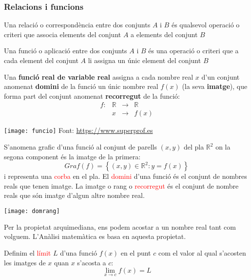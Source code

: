 \documentclass{beamer}
\begin{document}
\begin{frame}[allowframebreaks]
  \frametitle{Relacions i funcions}
  \begin{definicio}
    Una relació o correspondència entre dos conjunts $A$ i $B$ és qualsevol operació o criteri que associa elements del conjunt $A$ a elements del conjunt $B$
  \end{definicio}
  \begin{definicio}
    Una funció o aplicació entre dos conjunts $A$ i $B$ és una operació o criteri que a cada element del conjunt $A$ li assigna un únic element del conjunt $B$
  \end{definicio}
  Una {\bf funció real de variable real} assigna a cada nombre real $x$ d'un conjunt anomenat {\bf domini} de la funció un únic nombre real $f(x)$ (la seva {\bf imatge}), que forma part del conjunt anomenat {\bf recorregut} de la funció:
  \[
    \begin{array}{cccc}
      f:&\mathbb{R}&\rightarrow&\mathbb{R}\\
      &x&\rightarrow&f(x)
    \end{array}
  \]
  \begin{center}
    \texttt{[image: funcio]}
    \newline Font: \url{https://www.superprof.es}
  \end{center}
  S'anomena grafic d'una funció al conjunt de parells $(x,y)$ del pla $\mathbb{R}^2$ on la segona component és la imatge de la primera:
  \[
    Graf(f)=\left\{(x,y)\in \mathbb{R}^2: y= f(x)\right\}
  \]
  i representa una \textcolor{red}{corba} en el pla. El \textcolor{red}{domini} d'una funció és el conjunt de nombres reals que tenen imatge. La imatge o rang o \textcolor{red}{recorregut} és el conjunt de nombre reals que són imatge d'algun altre nombre real.
  \begin{center}
     \texttt{[image: domrang]}
  \end{center}

  Per la propietat arquimediana, ens podem acostar a un nombre real tant com volguem. L'Anàlisi matemàtica es basa en aquesta propietat.
  \begin{definicio}
    Definim el \textcolor{red}{límit} $L$ d'una funció $f(x)$ en el punt $c$ com el valor al qual s'acosten les imatges de $x$ quan $x$ s'acosta a $c$:
    \[
      \lim_{x \rightarrow c} f(x) = L
    \]
  \end{definicio}


\end{frame}
\end{document}
